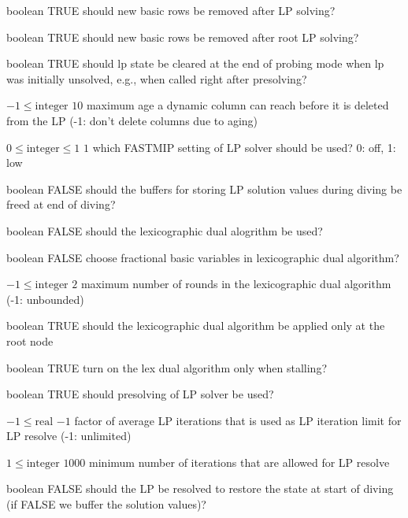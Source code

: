 %
{boolean}%
{TRUE}%
{should new basic rows be removed after LP solving?}%
{}

%
{boolean}%
{TRUE}%
{should new basic rows be removed after root LP solving?}%
{}

%
{boolean}%
{TRUE}%
{should lp state be cleared at the end of probing mode when lp was initially unsolved, e.g., when called right after presolving?}%
{}

%
{$-1\leq\textrm{integer}$}%
{$10$}%
{maximum age a dynamic column can reach before it is deleted from the LP (-1: don't delete columns due to aging)}%
{}

%
{$0\leq\textrm{integer}\leq1$}%
{$1$}%
{which FASTMIP setting of LP solver should be used? 0: off, 1: low}%
{}

%
{boolean}%
{FALSE}%
{should the buffers for storing LP solution values during diving be freed at end of diving?}%
{}

%
{boolean}%
{FALSE}%
{should the lexicographic dual alogrithm be used?}%
{}

%
{boolean}%
{FALSE}%
{choose fractional basic variables in lexicographic dual algorithm?}%
{}

%
{$-1\leq\textrm{integer}$}%
{$2$}%
{maximum number of rounds in the  lexicographic dual algorithm (-1: unbounded)}%
{}

%
{boolean}%
{TRUE}%
{should the lexicographic dual algorithm be applied only at the root node}%
{}

%
{boolean}%
{TRUE}%
{turn on the lex dual algorithm only when stalling?}%
{}

%
{boolean}%
{TRUE}%
{should presolving of LP solver be used?}%
{}

%
{$-1\leq\textrm{real}$}%
{$-1$}%
{factor of average LP iterations that is used as LP iteration limit for LP resolve (-1: unlimited)}%
{}

%
{$1\leq\textrm{integer}$}%
{$1000$}%
{minimum number of iterations that are allowed for LP resolve}%
{}

%
{boolean}%
{FALSE}%
{should the LP be resolved to restore the state at start of diving (if FALSE we buffer the solution values)?}%
{}

